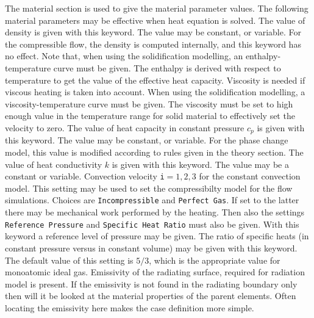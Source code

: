The material section is used to give the material parameter values. The
following material parameters may be effective when heat equation is solved.
\sifbegin
{}
The value of density is given with this keyword. The value may be constant,
or variable. For the compressible flow, the density is computed internally,
and this keyword has no effect.
Note that, when using the solidification modelling,
an enthalpy-temperature curve must be given. The enthalpy is derived with
respect to temperature to get the value of the effective heat capacity.
 Viscosity is needed if viscous heating 
is taken into account. When using the solidification modelling,
a viscosity-temperature curve must be given. The viscosity must be set
to high enough value in the temperature range for solid material to effectively
set the velocity to zero.
The value of heat capacity in constant pressure $c_p$ is given
with this keyword. The value may be constant,
or variable. For the phase change model, this value is modified according to
rules given in the theory section.
The value of heat conductivity $k$ is given with this keyword. The value may
be a constant or variable.
Convection velocity {\tt i}$=1,2,3$ for the constant convection model.
 This setting may be used to set the compressibilty
model for the flow simulations. Choices are {\tt Incompressible} and {\tt Perfect Gas}.
If set to the latter there may
be mechanical work performed by the heating.
Then also the settings {\tt Reference Pressure} and {\tt Specific Heat Ratio} must also be given.
 With this keyword a reference level of pressure may be given.
 The ratio of specific heats (in constant pressure
versus in constant volume) may be given with this keyword.
The default value of this setting is $5/3$, which
is the appropriate value for monoatomic ideal gas.
Emissivity of the radiating surface, required for radiation model is present.
If the emissivity is not found in the radiating boundary only then will it be looked at the 
material properties of the parent elements.
Often locating the emissivity here makes the case definition more simple.
\sifend

